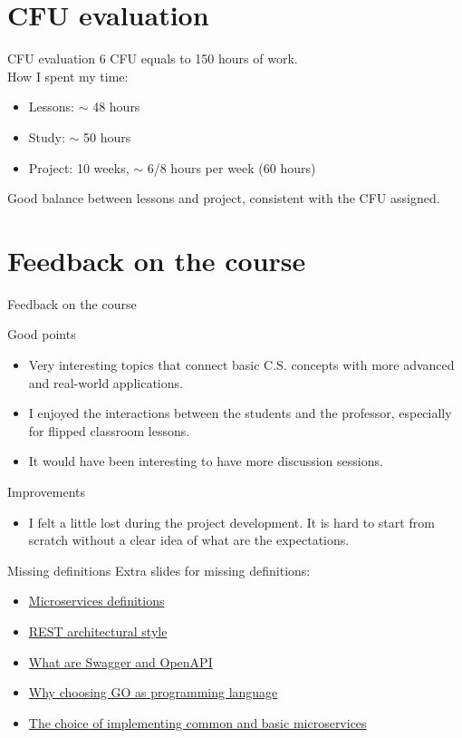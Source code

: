 \documentclass{beamer}
\begin{document}
\section{CFU evaluation}
\begin{frame}{CFU evaluation}
	6 CFU equals to 150 hours of work.
	\\
	How I spent my time:
	\begin{itemize}
		\item Lessons: $\sim$ 48 hours
		\item Study: $\sim$ 50 hours
		\item Project: 10 weeks, $\sim$ 6/8 hours per week (60 hours)
	\end{itemize}
	\begin{block}{}
		Good balance between lessons and project, consistent with the CFU assigned.
	\end{block}
\end{frame}

\section{Feedback on the course}
\begin{frame}{Feedback on the course}
	\begin{block}{Good points}
		\begin{itemize}
			\item Very interesting topics that connect basic C.S. concepts with more advanced and real-world applications.
			\item I enjoyed the interactions between the students and the professor, especially for flipped classroom lessons.
			\item It would have been interesting to have more discussion sessions.
		\end{itemize}
	\end{block}
	\begin{block}{Improvements}
		\begin{itemize}
			\item I felt a little lost during the project development. It is hard to start from scratch without a clear idea of what are the expectations.
		\end{itemize}
	\end{block}
\end{frame}

\begin{frame}{Missing definitions}
	\label{index_1}
	Extra slides for missing definitions:
		\begin{itemize}
			\item \hyperlink{microservices_definitions}{Microservices definitions}
			\item \hyperlink{rest}{REST architectural style}
			\item \hyperlink{swagger_openapi}{What are Swagger and OpenAPI}
			\item \hyperlink{golang}{Why choosing GO as programming language}
			\item \hyperlink{common_ms}{The choice of implementing common and basic microservices}
		\end{itemize}
\end{frame}
\end{document}
